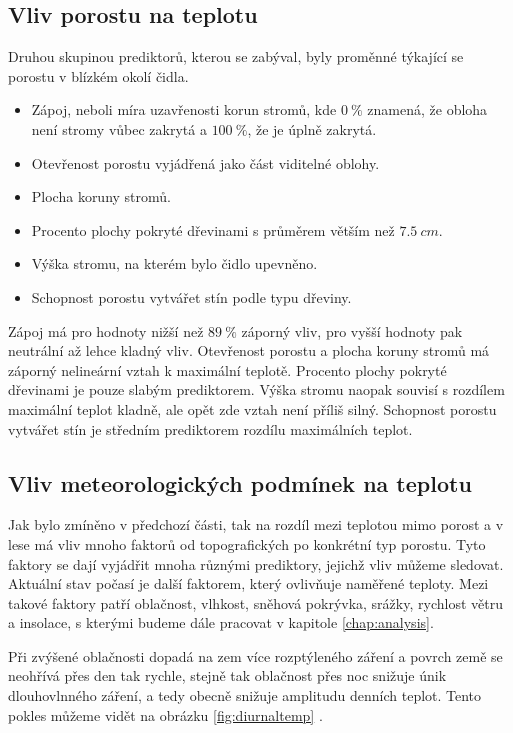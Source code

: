 \subsection{Vliv porostu na teplotu}
Druhou skupinou prediktorů, kterou se \parencite{ZellwegerFlorian2019Sdou} zabýval, byly proměnné týkající se porostu v blízkém okolí čidla.
\begin{itemize}
	\item Zápoj, neboli míra uzavřenosti korun stromů, kde $\SI{0}{\%}$ znamená, že obloha není stromy vůbec zakrytá a $\SI{100}{\%}$, že je úplně zakrytá.
	\item Otevřenost porostu vyjádřená jako část viditelné oblohy.
	\item Plocha koruny stromů.
	\item Procento plochy pokryté dřevinami s průměrem větším než $\SI{7.5}{cm}$.
	\item Výška stromu, na kterém bylo čidlo upevněno.
	\item Schopnost porostu vytvářet stín podle typu dřeviny.
\end{itemize}
Zápoj má pro hodnoty nižší než $\SI{89}{\%}$ záporný vliv, pro vyšší hodnoty pak neutrální až lehce kladný vliv. Otevřenost porostu a plocha koruny stromů má záporný nelineární vztah k maximální teplotě. Procento plochy pokryté dřevinami je pouze slabým prediktorem. Výška stromu naopak souvisí s rozdílem maximální teplot kladně, ale opět zde vztah není příliš silný. Schopnost porostu vytvářet stín je středním prediktorem rozdílu maximálních teplot.

\subsection{Vliv meteorologických podmínek na teplotu}
Jak bylo zmíněno v předchozí části, tak na rozdíl mezi teplotou mimo porost a v lese má vliv mnoho faktorů od topografických po konkrétní typ porostu. Tyto faktory se dají vyjádřit mnoha různými prediktory, jejichž vliv můžeme sledovat. Aktuální stav počasí je další faktorem, který ovlivňuje naměřené teploty. Mezi takové faktory patří oblačnost, vlhkost, sněhová pokrývka, srážky, rychlost větru a insolace, s kterými budeme dále pracovat v kapitole \ref{chap:analysis}.

Při zvýšené oblačnosti dopadá na zem více rozptýleného záření a povrch země se neohřívá přes den tak rychle, stejně tak oblačnost přes noc snižuje únik dlouhovlnného záření, a tedy obecně snižuje amplitudu denních teplot. Tento pokles můžeme vidět na obrázku \ref{fig:diurnaltemp} \parencite{arya2001}.

